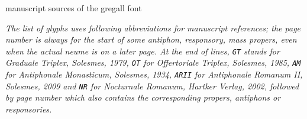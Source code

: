 \documentclass[a4paper]{article}
\begin{document}
\vfill
\pagebreak

\begin{center}
\huge{manuscript sources of the gregall font}
\end{center}

\textit{The list of glyphs uses following abbreviations for manuscript
references; the page number is always for the start of some antiphon,
responsory, mass propers, even when the actual neume is on a later page.
At the end of lines, \texttt{GT} stands for Graduale Triplex, Solesmes,
1979, \texttt{OT} for Offertoriale Triplex, Solesmes, 1985, \texttt{AM}
for Antiphonale Monasticum, Solesmes, 1934, \texttt{ARII} for Antiphonale
Romanum II, Solesmes, 2009 and \texttt{NR} for Nocturnale Romanum, Hartker
Verlag, 2002, followed by page number which also contains the corresponding
propers, antiphons or responsories.}
\end{document}
